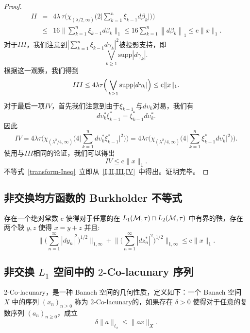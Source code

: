 \begin{proof}
\begin{eqnarray}
  II & = & 4 \lambda \, \tau \Big( \chi_{(\lambda/2,\infty)} \Big( 2
  \Big| \sum_{k=1}^n \xi_{k-1} d\beta_k \Big| \Big)\Big) \\
  \nonumber & \le & 16 \Big\| \sum_{k=1}^n \xi_{k-1} d\beta_k
  \Big\|_1 \le 16 \sum_{k=1}^n \left\|d\beta_k\right\|_1 \le
  \mathrm{c} \|x\|_1.
  \end{eqnarray}
  对于$III$，我们注意到$|\sum_{k=1}^n \xi_{k-1}d\gamma_k|^2$被投影支持，即
  $$\bigvee_{k\geq 1} \mathrm{supp}
  |d\gamma_k|.$$ 根据这一观察，我们得到
  \begin{equation} \label{III}
  III \leq 4\lambda \tau\Big(\bigvee_{k\geq 1} \mathrm{supp}
  |d\gamma_k|\Big) \leq \mathrm{c} \|x\|_1.
  \end{equation}
  对于最后一项$IV$，首先我们注意到由于$\xi_{k-1}$
  与$d\upsilon_k$对易，我们有$$d\upsilon^*_k
  \xi^*_{k-1}=\xi^*_{k-1}d{\upsilon}_k^*.$$ 因此
  $$IV = 4 \lambda \tau \Big( \chi_{(\lambda^2/4,\infty)} \Big( 4 \Big|
  \sum_{k=1}^n d\upsilon^*_k \xi_{k-1}^* \Big|^2 \Big)\Big)= 4
  \lambda  \tau \Big( \chi_{(\lambda^2/4,\infty)} \Big( 4 \Big|
  \sum_{k=1}^n \xi_{k-1}^*d\upsilon^*_k  \Big|^2 \Big)\Big). $$
  使用与$III$相同的论证，我们可以得出
  \begin{equation} \label{IV}
    IV \leq \mathrm{c} \|x\|_1.
  \end{equation}
  不等式~\eqref{transform-Ineq}~立即从~\eqref{I,II,III,IV}~中得出。证明完毕。    
\end{proof}

\subsection{非交换均方函数的 Burkholder 不等式}
\begin{theorem}
\cite*{parcet2006gundy}
  存在一个绝对常数 $\mathrm{c}$ 使得对于任意的在 $L_1(\mathcal{M}, \tau)\cap L_2(\mathcal{M}, \tau)$ 中有界的鞅，存在两个鞅 $y,z$ 使得 $x=y+z$ 并且:
  \begin{equation*}
    \Big\| \Big(\sum^\infty_{n=1} |dy_n|^2
    \Big)^{{1}/{2}} \Big\|_{1,\infty} + \Big\| \Big(\sum^\infty_{n=1}
    |dz_n^*|^2 \Big)^{1/2} \Big\|_{1,\infty} \leq \mathrm{c}
    \|x\|_1.
  \end{equation*}
\end{theorem}

\subsection{非交换 $L_1$ 空间中的 $2$-Co-lacunary 序列}
2-Co-lacunary，是一种 Banach 空间的几何性质，定义如下：一个 Banach 空间 $X$ 中的序列 $(x_n)_{n\geq0}$ 称为 
2-Co-lacunary的，如果存在 $\delta>0$ 使得对于任意的复数序列 $(a_n)_{n\geq0}$，成立
    \[\delta\|a\|_{\ell_2}\leq \|ax\|_{X}.\]

